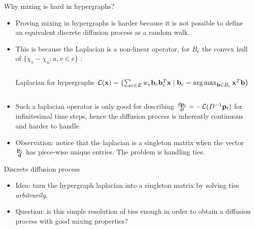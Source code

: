 \documentclass[../main.tex]{subfiles}
\begin{document}
    \begin{frame}{Why mixing is hard in hypergraphs?} 
        \begin{itemize}
        	\item Proving mixing in hypergraphs is harder because it is not possible to define an equivalent discrete diffusion process as a random walk.
        	\item This is because the Laplacian is a non-linear operator, for $B_e$ the convex hull of $\{\chi_v-\chi_u : u,v\in e\}$ \cite{continuous_laplacian_hypergraph}:
	        	\begin{columns}
	        		\begin{block}{Laplacian for hypergraphs}
	        			$ \mathcal{L}(\bold{x}) = \{\sum_{e\in E} w_e \bold{b}_e\bold{b}_e^T \bold{x} \mid \bold{b}_e = \operatorname*{arg\,max}_{\bold{b}\in B_e} \bold{x}^T\bold{b} \}$
	        		\end{block}
	        	\end{columns}
	        \item Such a laplacian operator is only good for describing $\frac{d \bold{p}_t}{d t} = -\mathcal{L}(D^{-1}\bold{p}_t)$ for infinitesimal time steps, hence the diffusion process is inherently continuous and harder to handle.
	        \item Observation: notice that the laplacian is a singleton matrix when the vector $\frac{\bold{p}_t}{\bold{d}}$ has piece-wise unique entries. The problem is handling ties. 	
        \end{itemize}
    \end{frame}
		
	\begin{frame}{Discrete diffusion process}
		\begin{itemize}
			\item Idea: turn the hypergraph laplacian into a singleton matrix by solving ties \textit{arbitrarily}. 
			\item Question: is this simple resolution of ties enough in order to obtain a diffusion process with good mixing properties?
		\end{itemize}
	\end{frame}
\end{document}
